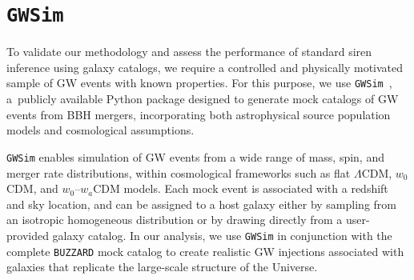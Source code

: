 \section{\texttt{GWSim}}
To validate our methodology and assess the performance of standard siren inference using galaxy catalogs, we require a controlled and physically motivated sample of \ac{GW} events with known properties. For this purpose, we use \texttt{\texttt{GWSim}}~\citep{karathanasis2023gwsim}, a~publicly available Python package designed to generate mock catalogs of \ac{GW} events from \ac{BBH} mergers, incorporating both astrophysical source population models and cosmological assumptions.

\texttt{\texttt{GWSim}} enables simulation of \ac{GW} events from a wide range of mass, spin, and merger rate distributions, within cosmological frameworks such as flat $\Lambda$CDM, $w_0$CDM, and $w_0\text{--}w_a$CDM models. Each mock event is associated with a redshift and sky location, and can be assigned to a host galaxy either by sampling from an isotropic homogeneous distribution or by drawing directly from a user-provided galaxy catalog. In our analysis, we use \texttt{\texttt{GWSim}} in conjunction with the complete \texttt{BUZZARD} mock catalog to create realistic \ac{GW} injections associated with galaxies that replicate the large-scale structure of the Universe.

